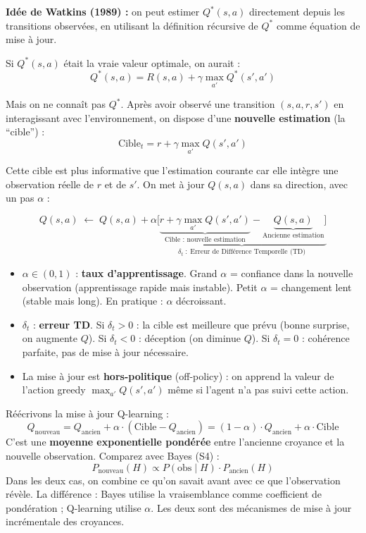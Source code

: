 \documentclass[11pt,a4paper]{article}
\begin{document}
\textbf{Idée de Watkins (1989) :} on peut estimer $Q^*(s,a)$ directement depuis les transitions observées, en utilisant la définition récursive de $Q^*$ comme équation de mise à jour.

Si $Q^*(s,a)$ était la vraie valeur optimale, on aurait :
$$Q^*(s, a) = R(s, a) + \gamma \max_{a'} Q^*(s', a')$$

Mais on ne connaît pas $Q^*$. Après avoir observé une transition $(s, a, r, s')$ en interagissant avec l'environnement, on dispose d'une \textbf{nouvelle estimation} (la ``cible'') :
$$\text{Cible}_t = r + \gamma \max_{a'} Q(s', a')$$

Cette cible est plus informative que l'estimation courante car elle intègre une observation réelle de $r$ et de $s'$. On met à jour $Q(s,a)$ dans sa direction, avec un pas $\alpha$ :

\begin{theorembox}
$$\boxed{Q(s, a) \;\leftarrow\; Q(s, a) + \alpha \underbrace{\bigl[ \underbrace{r + \gamma \max_{a'} Q(s', a')}_{\text{Cible : nouvelle estimation}} - \underbrace{Q(s, a)}_{\text{Ancienne estimation}} \bigr]}_{\delta_t \;:\; \text{Erreur de Différence Temporelle (TD)}}}$$

\begin{itemize}
    \item $\alpha \in (0,1)$ : \textbf{taux d'apprentissage}. Grand $\alpha$ = confiance dans la nouvelle observation (apprentissage rapide mais instable). Petit $\alpha$ = changement lent (stable mais long). En pratique : $\alpha$ décroissant.
    \item $\delta_t$ : \textbf{erreur TD}. Si $\delta_t > 0$ : la cible est meilleure que prévu (bonne surprise, on augmente $Q$). Si $\delta_t < 0$ : déception (on diminue $Q$). Si $\delta_t = 0$ : cohérence parfaite, pas de mise à jour nécessaire.
    \item La mise à jour est \textbf{hors-politique} (off-policy) : on apprend la valeur de l'action greedy $\max_{a'}Q(s',a')$ même si l'agent n'a pas suivi cette action.
\end{itemize}
\end{theorembox}

\begin{exemplebox}
Réécrivons la mise à jour Q-learning :
$$Q_{\text{nouveau}} = Q_{\text{ancien}} + \alpha \cdot (\text{Cible} - Q_{\text{ancien}}) = (1-\alpha) \cdot Q_{\text{ancien}} + \alpha \cdot \text{Cible}$$
C'est une \textbf{moyenne exponentielle pondérée} entre l'ancienne croyance et la nouvelle observation. Comparez avec Bayes (S4) :
$$P_{\text{nouveau}}(H) \propto P(\text{obs} \mid H) \cdot P_{\text{ancien}}(H)$$
Dans les deux cas, on combine ce qu'on savait avant avec ce que l'observation révèle. La différence : Bayes utilise la vraisemblance comme coefficient de pondération ; Q-learning utilise $\alpha$. Les deux sont des mécanismes de mise à jour incrémentale des croyances.
\end{exemplebox}
\end{document}
